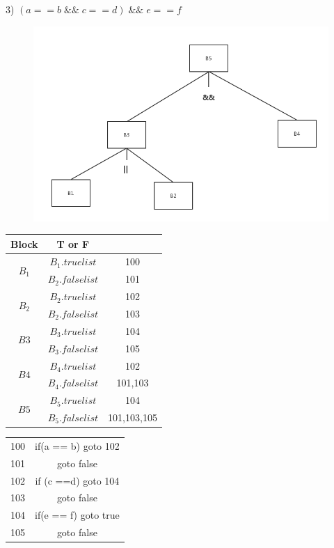 \documentclass[a4paper, 16pt]{article}
\begin{document}
3) $(a == b \;\&\&\; c == d)\; \&\& \;e == f$


\begin{figure}[H]
\centering
\includegraphics[scale=0.3]{chapter6_hw3_3}
\end{figure}

\begin{table}[H]
\centering
\begin{tabular}{c|c|c}
\hline
\hline
Block & T or F & \\
\hline
\multirow{2}{*}{$B_1$} 
&$B_1.truelist$ & 100\\
&$B_2.falselist$ &101\\
\hline
\multirow{2}{*}{$B_2$} 
&$B_2.truelist$&102\\
&$B_2.falselist$ &103\\
\hline
\multirow{2}{*}{$B3$} 
&$B_3.truelist$ &104\\
&$B_3.falselist$&105\\
\hline
\multirow{2}{*}{$B4$} 
&$B_4.truelist$&102\\
&$B_4.falselist$&101,103\\
\hline
\multirow{2}{*}{$B5$} 
&$B_5.truelist$&104\\
&$B_5.falselist$&101,103,105\\
\hline
\end{tabular}
\end{table}

\begin{table}[H]
\centering
\begin{tabular}{c c}
100 & if(a == b) goto 102\\
101 & goto false\\
102 &if (c ==d) goto 104\\
103 &goto false\\
104 & if(e == f) goto true\\
105 & goto false\\
\end{tabular}
\end{table}
\end{document}
